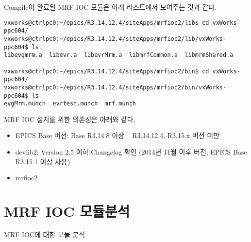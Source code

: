 \documentclass[11pt
  , a4paper
  , article
  , oneside
]{memoir}
\begin{document}
Compile이 완료된 MRF IOC 모듈은 아래 리스트에서 보여주는 것과 같다.
\begin{lstlisting}[style=termstyle]
vxworks@ctrlpc0:~/epics/R3.14.12.4/siteApps/mrfioc2/lib$ cd vxWorks-ppc604/
vxworks@ctrlpc0:~/epics/R3.14.12.4/siteApps/mrfioc2/lib/vxWorks-ppc604$ ls
libevgmrm.a  libevr.a  libevrMrm.a  libmrfCommon.a  libmrmShared.a

vxworks@ctrlpc0:~/epics/R3.14.12.4/siteApps/mrfioc2/bin$ cd vxWorks-ppc604/
vxworks@ctrlpc0:~/epics/R3.14.12.4/siteApps/mrfioc2/bin/vxWorks-ppc604$ ls
evgMrm.munch  evrtest.munch  mrf.munch
\end{lstlisting}

MRF IOC 설치를 위한 의존성은 아래와 같다.
\begin{itemize}
	\item EPICS Base 버전: Base R3.14.8 이상 ~ R3.14.12.4, R3.15.x 버전 미만
	\item devlib2: Version 2.5 이하 Changelog 확인 (2014년 11월 이후 버전, EPICS Base R3.15.1 이상 사용)
	\item mrfioc2
\end{itemize}


\chapter{MRF IOC 모듈분석}
MRF IOC에 대한 모듈 분석


\clearpage


\end{document}

